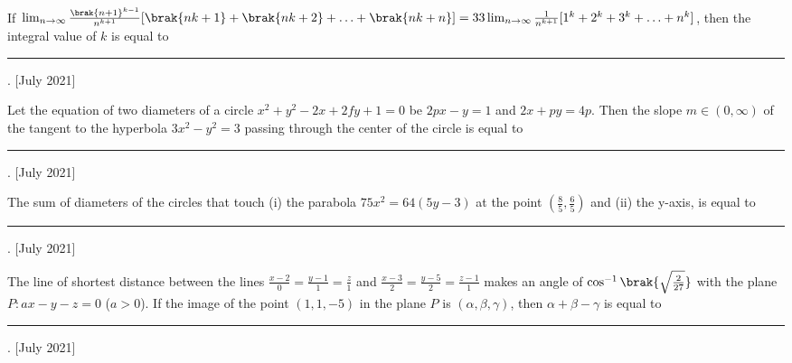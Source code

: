     \item If $\lim_{n \to \infty}\frac{\brak{n+1}^{k-1}}{n^{k+1}}[\brak{nk+1} + \brak{nk+2} + \ldots + \brak{nk+n}] = 33\lim_{n\to \infty}\frac{1}{n^{k+1}}[1^k+2^k+3^k+\ldots+n^k]$, then the integral value of $k$ is equal to \rule{2.5cm}{0.4pt}.
    \hfill{[July 2021]}
    
    \item Let the equation of two diameters of a circle $x^2 + y^2 - 2x + 2fy + 1 = 0$ be $2px - y = 1$ and $2x + py = 4p$. Then the slope $m \in (0, \infty)$ of the tangent to the hyperbola $3x^2 - y^2 = 3$ passing through the center of the circle is equal to \rule{2.5cm}{0.4pt}.
    \hfill{[July 2021]}
    
    \item The sum of diameters of the circles that touch (i) the parabola $75x^2 = 64(5y - 3)$ at the point $\left(\frac{8}{5}, \frac{6}{5}\right)$ and (ii) the y-axis, is equal to \rule{2.5cm}{0.4pt}.
    \hfill{[July 2021]}
    
    \item The line of shortest distance between the lines $\frac{x-2}{0} = \frac{y-1}{1} = \frac{z}{1}$ and $\frac{x-3}{2} = \frac{y-5}{2} = \frac{z-1}{1}$ makes an angle of $\cos^{-1}\brak{\sqrt{\frac{2}{27}}}$ with the plane $P: ax - y - z = 0$ ($a > 0$). If the image of the point $(1, 1, -5)$ in the plane $P$ is $(\alpha, \beta, \gamma)$, then $\alpha + \beta - \gamma$ is equal to \rule{2.5cm}{0.4pt}.
    \hfill{[July 2021]}
